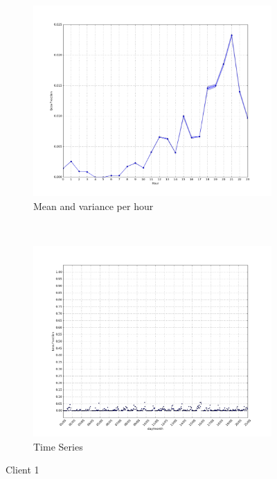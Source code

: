 \begin{figure}[H]
    \centering
    \begin{subfigure}[b]{0.5\textwidth}
        \centering
        \includegraphics[width=1.0\textwidth]{./figures/mean_per_hour_in_a_day_NHODTCSRV04_64:66:B3:50:06:90.png}
        \caption{Mean and variance per hour}
    \end{subfigure}%
    ~ 
    \begin{subfigure}[b]{0.5\textwidth}
        \centering
        \includegraphics[width=1.0\textwidth]{./figures/ts_NHODTCSRV04_64:66:B3:50:06:90.png}
        \caption{Time Series}
    \end{subfigure}
    \caption{Client 1}
    \label{fig:mean_day_hour_ts}
\end{figure}

